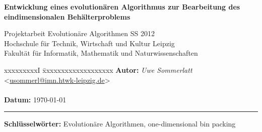 \newcommand{\KEYWORDS}{Evolution\"are Algorithmen, one-dimensional bin packing}
\newcommand{\TITLE}{Entwicklung eines evolution\"aren Algorithmus zur Bearbeitung des eindimensionalen Beh\"alterproblems}
\newcommand{\SUBTITLE}{Projektarbeit Evolution\"are Algorithmen SS 2012}
\newcommand{\INSTITUTE}{Hochschule f\"ur Technik, Wirtschaft und Kultur Leipzig}
\newcommand{\DEPARTMENT}{Fakult\"at f\"ur Informatik, Mathematik und Naturwissenschaften}
\newcommand{\AUTHOR}{Uwe Sommerlatt}
\newcommand{\SUBJECT}{}





    \begin{titlepage}
        \titlepageheader
        \Large
        \vspace*{-3mm}
        \begin{minipage}[t]{.95\textwidth}
            \textbf{\TITLE}        
        \end{minipage}
        \vspace{.6em}

        \large
        \SUBTITLE\\
        \INSTITUTE\\
        \DEPARTMENT\par
        \normalsize
        \begin{tabbing}
             xxxxxxxxxI \= xxxxxxxxxxxxxxxxxxx\kill
             \textbf{Autor:} \> \textit{Uwe Sommerlatt} <\href{mailto:usommerl@imn.htwk-leipzig.de?subject=\TITLE}{usommerl@imn.htwk-leipzig.de}>\\\\
            \textbf{Datum:} \> \today
        \end{tabbing}
        \vspace{-1.2em}
        {\color{rulegray}\rule[0cm]{\linewidth}{0.01cm}}\par
        \normalsize
        \textbf{Schlüsselwörter: }\KEYWORDS
        \par
    \end{titlepage}


